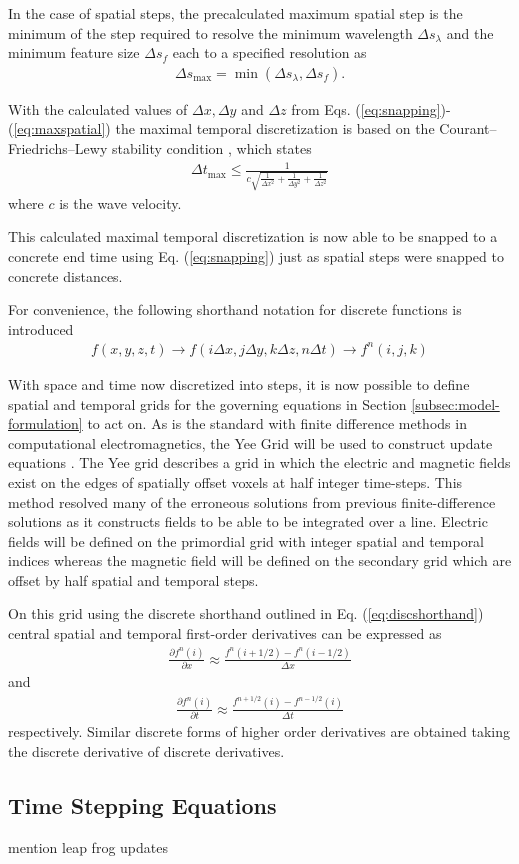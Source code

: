 In the case of spatial steps, the precalculated maximum spatial step is the minimum of the step required to resolve the minimum wavelength $\Delta s_\lambda$ and the minimum feature size $\Delta s_f$ each to a specified resolution as
\begin{align}
	\Delta s_{\max} = \min{(\Delta s_\lambda, \Delta s_f)}.
	\label{eq:maxspatial}
\end{align}

With the calculated values of $\Delta x, \Delta y$ and $\Delta z$ from Eqs. (\ref{eq:snapping})-(\ref{eq:maxspatial}) the maximal temporal discretization is based on the Courant–Friedrichs–Lewy stability condition \cite{jin2011theory}, which states
\begin{align}
	\Delta t_{\max} \leq \frac{1}{c\sqrt{\frac{1}{\Delta x^2}+\frac{1}{\Delta y^2}+\frac{1}{\Delta z^2}}}
\end{align}
where $c$ is the wave velocity.

This calculated maximal temporal discretization is now able to be snapped to a concrete end time using Eq. (\ref{eq:snapping}) just as spatial steps were snapped to concrete distances.

For convenience, the following shorthand notation for discrete functions is introduced
\begin{align}
	f(x,y,z,t)\rightarrow f(i\Delta x, j\Delta y, k\Delta z, n\Delta t)\rightarrow f^n(i,j,k)
	\label{eq:discshorthand}
\end{align}

With space and time now discretized into steps, it is now possible to define spatial and temporal grids for the governing equations in Section \ref{subsec:model-formulation} to act on. As is the standard with finite difference methods in computational electromagnetics, the Yee Grid will be used to construct update equations \cite{taftlovefdtd}. The Yee grid describes a grid in which the electric and magnetic fields exist on the edges of spatially offset voxels at half integer time-steps\cite{yee}. This method resolved many of the erroneous solutions from previous finite-difference solutions as it constructs fields to be able to be integrated over a line\cite{rothlecnotes}. Electric fields will be defined on the primordial grid with integer spatial and temporal indices whereas the magnetic field will be defined on the secondary grid which are offset by half spatial and temporal steps.

On this grid using the discrete shorthand outlined in Eq. (\ref{eq:discshorthand}) central spatial and temporal first-order derivatives can be expressed as
\begin{align}
	\frac{\partial f^n(i)}{\partial x} \approx \frac{f^n(i+1/2)- f^n(i-1/2)}{\Delta x}
\end{align}
and
\begin{align}
	\frac{\partial f^n(i)}{\partial t} \approx \frac{f^{n+1/2}(i)- f^{n-1/2}(i)}{\Delta t}
\end{align}
respectively. Similar discrete forms of higher order derivatives are obtained taking the discrete derivative of discrete derivatives.

\subsection{Time Stepping Equations}
\label{subsec:timestepeqs}
mention leap frog updates
